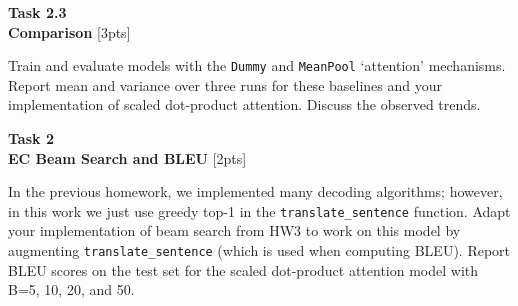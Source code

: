 \documentclass[12pt,article]{article}
\newenvironment{task}[2][Task]
    { \begin{mdframed}[backgroundcolor=gray!20] \textbf{#1 #2} \\}
    {  \end{mdframed}}
\begin{document}
\begin{task}{2.3} 
\textbf{Comparison} [3pts]

Train and evaluate models with the \texttt{Dummy} and \texttt{MeanPool} `attention' mechanisms. Report mean and variance over three runs for these baselines and your implementation of scaled dot-product attention. Discuss the observed trends.
\end{task}

\begin{task}{2} 
\textbf{EC Beam Search and BLEU} [2pts]

In the previous homework, we implemented many decoding algorithms; however, in this work we just use greedy top-1 in the \texttt{translate\_sentence} function. Adapt your implementation of beam search from HW3 to work on this model by augmenting \texttt{translate\_sentence} (which is used when computing BLEU).  Report BLEU scores on the test set for the scaled dot-product attention model with B=5, 10, 20, and 50.
\end{task}



\end{document}

